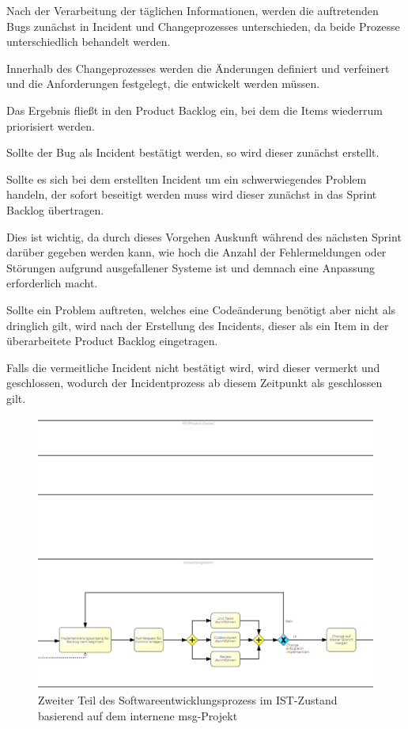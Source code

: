 Nach der Verarbeitung der täglichen Informationen, werden die auftretenden Bugs zunächst in Incident und Changeprozesses unterschieden, da beide Prozesse unterschiedlich behandelt werden.

Innerhalb des Changeprozesses werden die Änderungen definiert und verfeinert und die Anforderungen festgelegt, die entwickelt werden müssen. 

Das Ergebnis fließt in den Product Backlog ein, bei dem die Items wiederrum priorisiert werden. 

Sollte der Bug als Incident bestätigt werden, so wird dieser zunächst erstellt. 

Sollte es sich bei dem erstellten Incident um ein schwerwiegendes Problem handeln, der sofort beseitigt werden muss wird dieser zunächst in das Sprint Backlog übertragen.

Dies ist wichtig, da durch dieses Vorgehen Auskunft während des nächsten Sprint darüber gegeben werden kann, wie hoch die Anzahl der Fehlermeldungen oder Störungen aufgrund ausgefallener Systeme ist und demnach eine Anpassung erforderlich macht. 

Sollte ein Problem auftreten, welches eine Codeänderung benötigt aber nicht als dringlich gilt, wird nach der Erstellung des Incidents, dieser als ein Item in der überarbeitete Product Backlog eingetragen. 

Falls die vermeitliche Incident nicht bestätigt wird, wird dieser vermerkt und geschlossen, wodurch der Incidentprozess ab diesem Zeitpunkt als geschlossen gilt. \\ 

\begin{figure}[h]
    \centering
    \includegraphics[scale=0.6]{Bilder/IST-Prozess_second Part.png}
    \caption{Zweiter Teil des Softwareentwicklungsprozess im IST-Zustand basierend auf dem internene msg-Projekt}
\end{figure}

